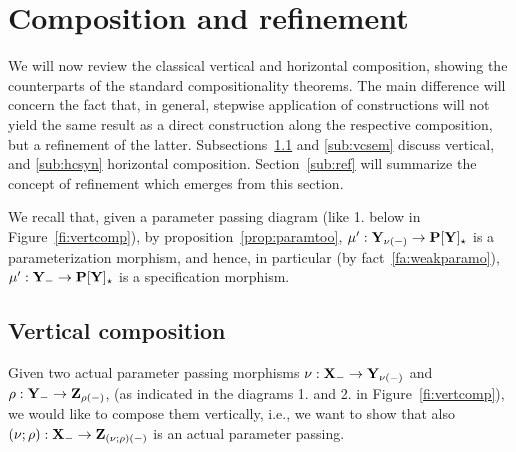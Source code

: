 
%
\section{Composition and refinement}\label{se:compref}
%
We will now review the classical vertical and horizontal
composition, showing the counterparts of the standard compositionality
theorems. The main difference will concern the fact that, in general,
stepwise application of constructions will not yield the same result as a direct
construction along the respective composition, but a refinement of the latter.
Subsections~\ref{sub:vcsyn} and \ref{sub:vcsem} discuss vertical, and
\ref{sub:hcsyn} %
horizontal composition. Section~\ref{sub:ref} will summarize the concept of refinement
which emerges from this section.

We recall that, given a parameter passing diagram (like 1. below in
Figure~\ref{fi:vertcomp}), by proposition~\ref{prop:paramtoo},
$\mu':{\bf Y_{\nu(-)}}\to {\bf P[Y]_\star}$ is a parameterization
morphism, and hence, in particular (by fact~\ref{fa:weakparamo}), $\mu':{\bf Y}_-\to{\bf P[Y]_\star}$ is a specification morphism.


\subsection{Vertical composition}\label{sub:vcsyn}
Given two actual parameter passing morphisms $\nu:{\bf X}_-\to {\bf Y}_{\nu(-)}$ and $\rho:{\bf Y}_-\to {\bf Z}_{\rho(-)}$,
(as indicated in the diagrams 1. and 2. in Figure~\ref{fi:vertcomp}), 
we would like to compose them vertically, i.e.,
we want to show that also $(\nu;\rho):{\bf X}_- \to {\bf Z}_{(\nu;\rho)(-)}$ is
an actual parameter passing.\vspace*{-3ex}

